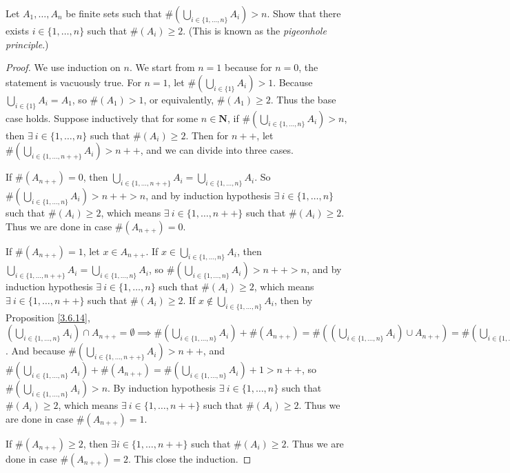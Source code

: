 \begin{exercise}\label{ex 3.6.10}
    Let \(A_1, \dots, A_n\) be finite sets such that \(\#(\bigcup_{i \in \{1, \dots, n\}} A_i) > n\).
    Show that there exists \(i \in \{1, \dots, n\}\) such that \(\#(A_i) \geq 2\).
    (This is known as the \emph{pigeonhole principle}.)
\end{exercise}

\begin{proof}
    We use induction on \(n\).
    We start from \(n = 1\) because for \(n = 0\), the statement is vacuously true.
    For \(n = 1\), let \(\#(\bigcup_{i \in \{1\}} A_i) > 1\).
    Because \(\bigcup_{i \in \{1\}} A_i = A_1\), so \(\#(A_1) > 1\), or equivalently, \(\#(A_1) \geq 2\).
    Thus the base case holds.
    Suppose inductively that for some \(n \in \mathbf{N}\), if \(\#(\bigcup_{i \in \{1, \dots, n\}} A_i) > n\), then \(\exists\ i \in \{1, \dots, n\}\) such that \(\#(A_i) \geq 2\).
    Then for \(n++\), let \(\#(\bigcup_{i \in \{1, \dots, n++\}} A_i) > n++\), and we can divide into three cases.

    If \(\#(A_{n++}) = 0\), then \(\bigcup_{i \in \{1, \dots, n++\}} A_i = \bigcup_{i \in \{1, \dots, n\}} A_i\).
    So \(\#(\bigcup_{i \in \{1, \dots, n\}} A_i) > n++ > n\), and by induction hypothesis \(\exists\ i \in \{1, \dots, n\}\) such that \(\#(A_i) \geq 2\), which means \(\exists\ i \in \{1, \dots, n++\}\) such that \(\#(A_i) \geq 2\).
    Thus we are done in case \(\#(A_{n++}) = 0\).

    If \(\#(A_{n++}) = 1\), let \(x \in A_{n++}\).
    If \(x \in \bigcup_{i \in \{1, \dots, n\}} A_i\), then \(\bigcup_{i \in \{1, \dots, n++\}} A_i = \bigcup_{i \in \{1, \dots, n\}} A_i\), so \(\#(\bigcup_{i \in \{1, \dots, n\}} A_i) > n++ > n\), and by induction hypothesis \(\exists\ i \in \{1, \dots, n\}\) such that \(\#(A_i) \geq 2\), which means \(\exists\ i \in \{1, \dots, n++\}\) such that \(\#(A_i) \geq 2\).
    If \(x \notin \bigcup_{i \in \{1, \dots, n\}} A_i\), then by Proposition \ref{3.6.14}, \((\bigcup_{i \in \{1, \dots, n\}} A_i) \cap A_{n++} = \emptyset \implies \#(\bigcup_{i \in \{1, \dots, n\}} A_i) + \#(A_{n++}) = \#((\bigcup_{i \in \{1, \dots, n\}} A_i) \cup A_{n++}) = \#(\bigcup_{i \in \{1, \dots, n++\}} A_i)\).
    And because \(\#(\bigcup_{i \in \{1, \dots, n++\}} A_i) > n++\), and \(\#(\bigcup_{i \in \{1, \dots, n\}} A_i) + \#(A_{n++}) = \#(\bigcup_{i \in \{1, \dots, n\}} A_i) + 1 > n++\), so \(\#(\bigcup_{i \in \{1, \dots, n\}} A_i) > n\).
    By induction hypothesis \(\exists\ i \in \{1, \dots, n\}\) such that \(\#(A_i) \geq 2\), which means \(\exists\ i \in \{1, \dots, n++\}\) such that \(\#(A_i) \geq 2\).
    Thus we are done in case \(\#(A_{n++}) = 1\).

    If \(\#(A_{n++}) \geq 2\), then \(\exists i \in \{1, \dots, n++\}\) such that \(\#(A_i) \geq 2\).
    Thus we are done in case \(\#(A_{n++}) = 2\).
    This close the induction.
\end{proof}